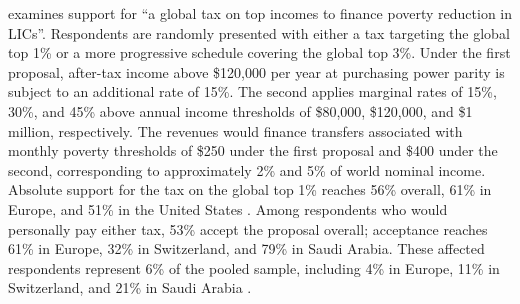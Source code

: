 
\citet{fabre_public_2026} examines support for ``a global tax on top incomes to finance poverty reduction in LICs''. Respondents are randomly presented with either a tax targeting the global top 1\% or a more progressive schedule covering the global top 3\%. Under the first proposal, after-tax income above \$120,000 per year at purchasing power parity is subject to an additional rate of 15\%. The second applies marginal rates of 15\%, 30\%, and 45\% above annual income thresholds of \$80,000, \$120,000, and \$1 million, respectively. The revenues would finance transfers associated with monthly poverty thresholds of \$250 under the first proposal and \$400 under the second, corresponding to approximately 2\% and 5\% of world nominal income. Absolute support for the tax on the global top 1\% reaches 56\% overall, 61\% in Europe, and 51\% in the United States \citep[Figure S40]{fabre_public_2026}. Among respondents who would personally pay either tax, 53\% accept the proposal overall; acceptance reaches 61\% in Europe, 32\% in Switzerland, and 79\% in Saudi Arabia. These affected respondents represent 6\% of the pooled sample, including 4\% in Europe, 11\% in Switzerland, and 21\% in Saudi Arabia \citep[Figure S41]{fabre_public_2026}.

